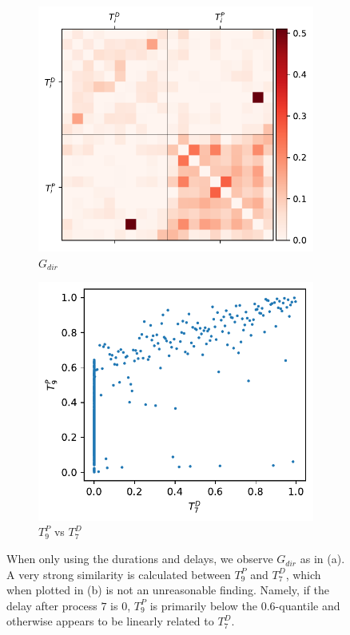 \documentclass[../Thesis.tex]{subfiles}
\begin{document}
\begin{figure}[H]
    \centering
    \begin{subfigure}[t]{0.49\linewidth}
        \includegraphics[width = \linewidth]{figures/Cycle data/G_dir times - symmetric.pdf}
        \caption{$G_{dir}$}
        \label{subfig:G_dir using only times}
    \end{subfigure}
    \hfill
    \begin{subfigure}[t]{0.49\linewidth}
        \includegraphics[width=\linewidth]{figures/Cycle data/G_dir times - symmetric - TP9 vs TD7.pdf}
        \caption{$T^P_9$ vs $T^D_7$}
        \label{subfig:G_dir times - TP9 vs TD7}
    \end{subfigure}
    \caption{When only using the durations and delays, we observe $G_{dir}$ as in (a). A very strong similarity is calculated between $T^P_9$ and $T^D_7$, which when plotted in (b) is not an unreasonable finding. Namely, if the delay after process $7$ is $0$, $T^P_9$ is primarily below the $0.6$-quantile and otherwise appears to be linearly related to $T^D_7$.}
    \label{fig:G_dir using only times}
\end{figure}
\end{document}
